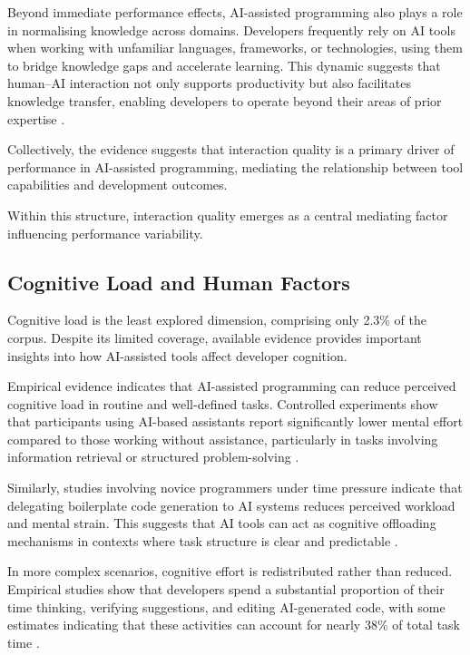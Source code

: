 \documentclass[conference]{IEEEtran}
\begin{document}
Beyond immediate performance effects, AI-assisted programming also plays a role in normalising knowledge across domains. Developers frequently rely on AI tools when working with unfamiliar languages, frameworks, or technologies, using them to bridge knowledge gaps and accelerate learning. This dynamic suggests that human--AI interaction not only supports productivity but also facilitates knowledge transfer, enabling developers to operate beyond their areas of prior expertise \cite{aguiar_multi-language_2024}.

Collectively, the evidence suggests that interaction quality is a primary driver of performance in AI-assisted programming, mediating the relationship between tool capabilities and development outcomes.

Within this structure, interaction quality emerges as a central mediating factor influencing performance variability.

\subsection{Cognitive Load and Human Factors}

Cognitive load is the least explored dimension, comprising only 2.3\% of the corpus. Despite its limited coverage, available evidence provides important insights into how AI-assisted tools affect developer cognition.

Empirical evidence indicates that AI-assisted programming can reduce perceived cognitive load in routine and well-defined tasks. Controlled experiments show that participants using AI-based assistants report significantly lower mental effort compared to those working without assistance, particularly in tasks involving information retrieval or structured problem-solving \cite{gardella_performance_2024}.

Similarly, studies involving novice programmers under time pressure indicate that delegating boilerplate code generation to AI systems reduces perceived workload and mental strain. This suggests that AI tools can act as cognitive offloading mechanisms in contexts where task structure is clear and predictable \cite{gardella_performance_2024}.

In more complex scenarios, cognitive effort is redistributed rather than reduced. Empirical studies show that developers spend a substantial proportion of their time thinking, verifying suggestions, and editing AI-generated code, with some estimates indicating that these activities can account for nearly 38\% of total task time \cite{tang_study_2024}.
\end{document}
